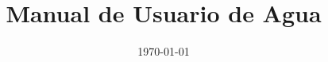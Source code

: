 ﻿\documentclass[12pt,a4paper]{article}
\title{Manual de Usuario de Agua}
\author{}
\date{\today}
\begin{document}
\maketitle
\manualnotalinks
\manualnavegacion
\tableofcontents
\newpage



\bigskip
\manualnavegacion
\end{document}
